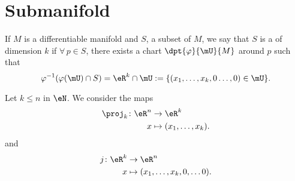 \section{Submanifold}

\begin{definition}      \label{DEFooLQHWooMOTgzq}
	If $M$ is a differentiable manifold and $S$, a subset of $M$, we say that $S$ is a  of dimension $k$ if $\forall\,p\in S$, there exists a chart $\dpt{\varphi}{\mU}{M}$ around $p$ such that
	\begin{equation}        \label{EQooLWQRooQJCQbA}
		\varphi^{-1}(\varphi(\mU)\cap S)=\eR^k\cap\mU:=\{(x_1,\ldots,x_k,0\ldots,0)\in\mU\}.
	\end{equation}
\end{definition}

Let \( k\leq n\) in \( \eN\). We consider the maps
\begin{equation}
	\begin{aligned}
		\proj_k\colon \eR^n & \to \eR^k                  \\
		x                   & \mapsto (x_1,\ldots, x_k).
	\end{aligned}
\end{equation}
and
\begin{equation}
	\begin{aligned}
		j\colon \eR^k & \to \eR^n                             \\
		x             & \mapsto (x_1,\ldots, x_k,0,\ldots 0).
	\end{aligned}
\end{equation}

